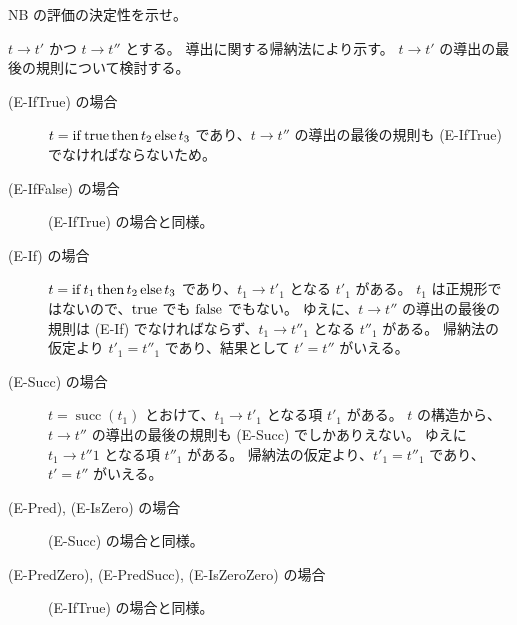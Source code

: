\begin{jexercise*}[3.5.14.]
  NB の評価の決定性を示せ。
\end{jexercise*}
\begin{jproof}
  $t \to t'$ かつ $t \to t''$ とする。
  導出に関する帰納法により示す。
  $t \to t'$ の導出の最後の規則について検討する。
  \begin{description}
    \item[(E-IfTrue) の場合]
      $t = \operatorname{if} \operatorname{true} \operatorname{then} t_2 \operatorname{else} t_3$ であり、$t \to t''$ の導出の最後の規則も (E-IfTrue) でなければならないため。
    \item[(E-IfFalse) の場合]
      (E-IfTrue) の場合と同様。
    \item[(E-If) の場合]
      $t = \operatorname{if} t_1 \operatorname{then} t_2 \operatorname{else} t_3$ であり、$t_1 \to t'_1$ となる $t'_1$ がある。
      $t_1$ は正規形ではないので、$\operatorname{true}$ でも $\operatorname{false}$ でもない。
      ゆえに、$t \to t''$ の導出の最後の規則は (E-If) でなければならず、$t_1 \to t''_1$ となる $t''_1$ がある。
      帰納法の仮定より $t'_1 = t''_1$ であり、結果として $t' = t''$ がいえる。
    \item[(E-Succ) の場合]
      $t = \operatorname{succ}(t_1)$ とおけて、$t_1 \to t'_1$ となる項 $t'_1$ がある。
      $t$ の構造から、$t \to t''$ の導出の最後の規則も (E-Succ) でしかありえない。
      ゆえに $t_1 \to t''1$ となる項 $t''_1$ がある。
      帰納法の仮定より、$t'_1 = t''_1$ であり、$t' = t''$ がいえる。
    \item[(E-Pred), (E-IsZero) の場合]
      (E-Succ) の場合と同様。
    \item[(E-PredZero), (E-PredSucc), (E-IsZeroZero) の場合]
      (E-IfTrue) の場合と同様。
  \end{description}
\end{jproof}
